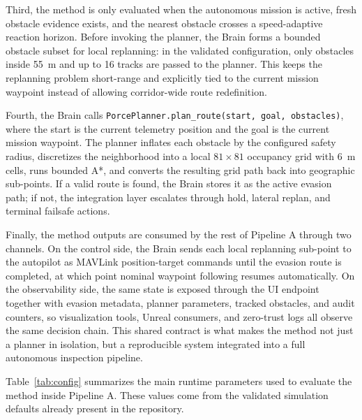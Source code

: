 \documentclass[a4paper,11pt]{article}
\begin{document}
Third, the method is only evaluated when the autonomous mission is active, fresh obstacle evidence exists, and the nearest obstacle crosses a speed-adaptive reaction horizon. Before invoking the planner, the Brain forms a bounded obstacle subset for local replanning: in the validated configuration, only obstacles inside \SI{55}{\meter} and up to 16 tracks are passed to the planner. This keeps the replanning problem short-range and explicitly tied to the current mission waypoint instead of allowing corridor-wide route redefinition.

Fourth, the Brain calls \texttt{PorcePlanner.plan\_route(start, goal, obstacles)}, where the start is the current telemetry position and the goal is the current mission waypoint. The planner inflates each obstacle by the configured safety radius, discretizes the neighborhood into a local \(81 \times 81\) occupancy grid with \SI{6}{\meter} cells, runs bounded A*, and converts the resulting grid path back into geographic sub-points. If a valid route is found, the Brain stores it as the active evasion path; if not, the integration layer escalates through hold, lateral replan, and terminal failsafe actions.

Finally, the method outputs are consumed by the rest of Pipeline A through two channels. On the control side, the Brain sends each local replanning sub-point to the autopilot as MAVLink position-target commands until the evasion route is completed, at which point nominal waypoint following resumes automatically. On the observability side, the same state is exposed through the UI endpoint together with evasion metadata, planner parameters, tracked obstacles, and audit counters, so visualization tools, Unreal consumers, and zero-trust logs all observe the same decision chain. This shared contract is what makes the method not just a planner in isolation, but a reproducible system integrated into a full autonomous inspection pipeline.

Table~\ref{tab:config} summarizes the main runtime parameters used to evaluate the method inside Pipeline A. These values come from the validated simulation defaults already present in the repository.
\end{document}
